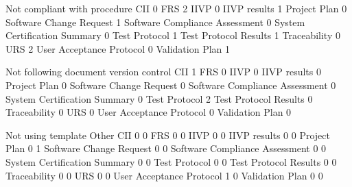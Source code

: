 \documentclass{article}
\begin{document}
\begin{Schunk}
\begin{Soutput}
                                 Not compliant with procedure
  CII                                                       0
  FRS                                                       2
  IIVP                                                      0
  IIVP results                                              1
  Project Plan                                              0
  Software Change Request                                   1
  Software Compliance Assessment                            0
  System Certification Summary                              0
  Test Protocol                                             1
  Test Protocol Results                                     1
  Traceability                                              0
  URS                                                       2
  User Acceptance Protocol                                  0
  Validation Plan                                           1
                                
                                 Not following document version control
  CII                                                                 1
  FRS                                                                 0
  IIVP                                                                0
  IIVP results                                                        0
  Project Plan                                                        0
  Software Change Request                                             0
  Software Compliance Assessment                                      0
  System Certification Summary                                        0
  Test Protocol                                                       2
  Test Protocol Results                                               0
  Traceability                                                        0
  URS                                                                 0
  User Acceptance Protocol                                            0
  Validation Plan                                                     0
                                
                                 Not using template Other
  CII                                             0     0
  FRS                                             0     0
  IIVP                                            0     0
  IIVP results                                    0     0
  Project Plan                                    0     1
  Software Change Request                         0     0
  Software Compliance Assessment                  0     0
  System Certification Summary                    0     0
  Test Protocol                                   0     0
  Test Protocol Results                           0     0
  Traceability                                    0     0
  URS                                             0     0
  User Acceptance Protocol                        1     0
  Validation Plan                                 0     0
                                

\end{Soutput}
\end{Schunk}
\end{document}
